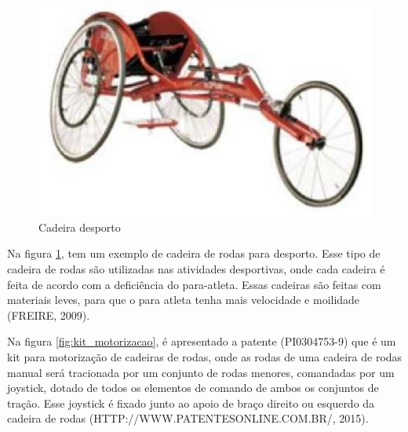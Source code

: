 \begin{figure}[!htb]
  \centering
  \includegraphics[keepaspectratio=true,scale=0.50]{figuras/introducao/cadeira_desporte}
  \caption{Cadeira desporto}
  \label{fig:desporto}
\end{figure}


Na figura \ref{fig:desporto}, tem um exemplo de cadeira de rodas para desporto. Esse tipo de cadeira de rodas são utilizadas nas atividades desportivas, onde cada cadeira é feita de acordo com a deficiência do para-atleta. Essas cadeiras são feitas com materiais leves, para que o para atleta tenha mais velocidade e moilidade (FREIRE, 2009).

Na figura \ref{fig:kit_motorizacao}, é apresentado a patente (PI0304753-9) que é um kit para motorização de cadeiras de rodas, onde as rodas de uma cadeira de rodas manual será tracionada por um conjunto de rodas menores, comandadas por um joystick, dotado de todos os elementos de comando de ambos os conjuntos de tração. Esse joystick é fixado junto ao apoio de braço direito ou esquerdo da cadeira de rodas (HTTP://WWW.PATENTESONLINE.COM.BR/,
2015).

